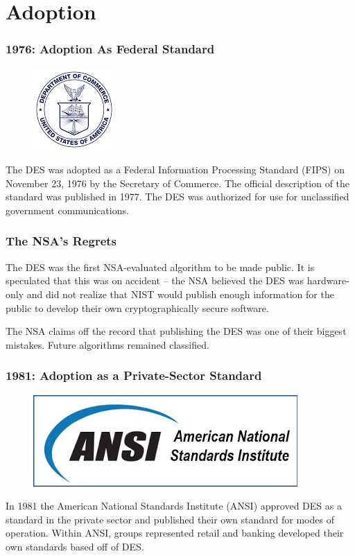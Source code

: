\documentclass{beamer}
\newcommand{\<}{\langle}
\renewcommand{\>}{\rangle}
\begin{document}
\section{Adoption}


\begin{frame}
\frametitle{1976: Adoption As Federal Standard}

\begin{figure}
\includegraphics[scale=.9]{IMG/commerce}
\end{figure}

The DES was adopted as a Federal Information Processing Standard (FIPS) on November 23, 1976 by the Secretary of Commerce. The official description of the standard was published in 1977. The DES was authorized for use for unclassified government communications. \newline
\end{frame}


\begin{frame}
\frametitle{The NSA's Regrets}
The DES was the first NSA-evaluated algorithm to be made public. It is speculated that this was on accident -- the NSA believed the DES was hardware-only and did not realize that NIST would publish enough information for the public to develop their own cryptographically secure software.\newline

The NSA claims off the record that publishing the DES was one of their biggest mistakes. Future algorithms remained classified. 
\end{frame}



\begin{frame}
\frametitle{1981: Adoption as a Private-Sector Standard}

\begin{figure}
\includegraphics[scale=.5]{IMG/ansi}
\end{figure}

In 1981 the American National Standards Institute (ANSI) approved DES as a standard in the private sector and published their own standard for modes of operation. Within ANSI, groups represented retail and banking developed their own standards based off of DES. 
\end{frame}
\end{document}
